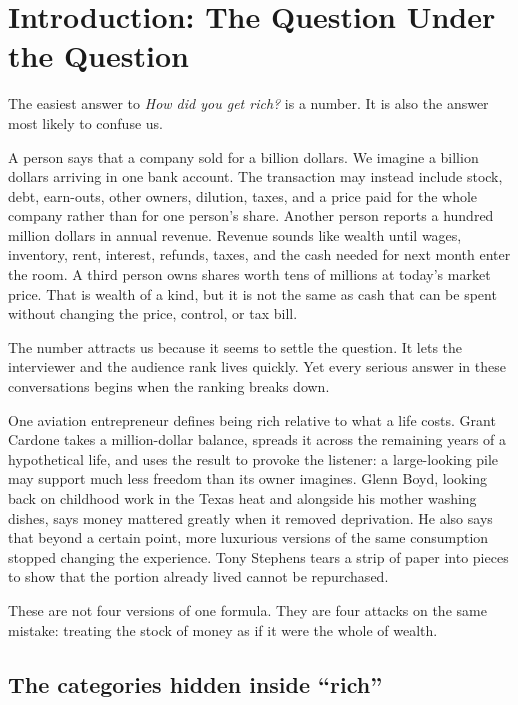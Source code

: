 \chapter*{Introduction: The Question Under the Question}

The easiest answer to \emph{How did you get rich?} is a number. It is also the
answer most likely to confuse us.

A person says that a company sold for a billion dollars. We imagine a billion
dollars arriving in one bank account. The transaction may instead include
stock, debt, earn-outs, other owners, dilution, taxes, and a price paid for the
whole company rather than for one person's share. Another person reports a
hundred million dollars in annual revenue. Revenue sounds like wealth until
wages, inventory, rent, interest, refunds, taxes, and the cash needed for next
month enter the room. A third person owns shares worth tens of millions at
today's market price. That is wealth of a kind, but it is not the same as cash
that can be spent without changing the price, control, or tax bill.

The number attracts us because it seems to settle the question. It lets the
interviewer and the audience rank lives quickly. Yet every serious answer in
these conversations begins when the ranking breaks down.

One aviation entrepreneur defines being rich relative to what a life costs.
Grant Cardone takes a million-dollar balance, spreads it across the remaining
years of a hypothetical life, and uses the result to provoke the listener: a
large-looking pile may support much less freedom than its owner imagines. Glenn
Boyd, looking back on childhood work in the Texas heat and alongside his mother
washing dishes, says money mattered greatly when it removed deprivation. He
also says that beyond a certain point, more luxurious versions of the same
consumption stopped changing the experience. Tony Stephens tears a strip of
paper into pieces to show that the portion already lived cannot be repurchased.

These are not four versions of one formula. They are four attacks on the same
mistake: treating the stock of money as if it were the whole of wealth.

\section*{The categories hidden inside ``rich''}

